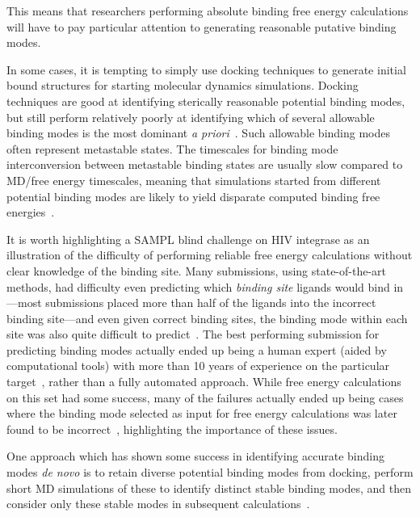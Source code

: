 \documentclass[9pt,bestpractices]{livecoms}
\begin{document}
This means that researchers performing absolute binding free energy calculations will have to pay particular attention to generating reasonable putative binding modes.

In some cases, it is tempting to simply use docking techniques to generate initial bound structures for starting molecular dynamics simulations. Docking techniques are good at identifying sterically reasonable potential binding modes, but still perform relatively poorly at identifying which of several allowable binding modes is the most dominant \emph{a priori}~\cite{macdermott-opeskinComputationalCommunityBlind2026}. Such allowable binding modes often represent metastable states. The timescales for binding mode interconversion between metastable binding states are usually slow compared to MD/free energy timescales, meaning that simulations started from different potential binding modes are likely to yield disparate computed binding free energies~\cite{mobley2006use, palma2012computation, mobley2012perspective, gill2018binding}. 


It is worth highlighting a SAMPL blind challenge on HIV integrase as an illustration of the difficulty of performing reliable free energy calculations without clear knowledge of the binding site. 
Many submissions, using state-of-the-art methods, had difficulty even predicting which \emph{binding site} ligands would bind in---most submissions placed more than half of the ligands into the incorrect binding site---and even given correct binding sites, the binding mode within each site was also quite difficult to predict~\cite{mobley2014blind}.
The best performing submission for predicting binding modes actually ended up being a human expert (aided by computational tools) with more than 10 years of experience on the particular target~\cite{voet2014combining}, rather than a fully automated approach.
While free energy calculations on this set had some success, many of the failures actually ended up being cases where the binding mode selected as input for free energy calculations was later found to be incorrect~\cite{gallicchio2014virtual}, highlighting the importance of these issues.

One approach which has shown some success in identifying accurate binding modes \emph{de novo} is to retain diverse potential binding modes from docking, perform short MD simulations of these to identify distinct stable binding modes, and then consider only these stable modes in subsequent calculations~\cite{gallicchio2014virtual, mobley2006use,rocklin2013blind, boyce2009predicting, mobley2007predicting}.
\end{document}
